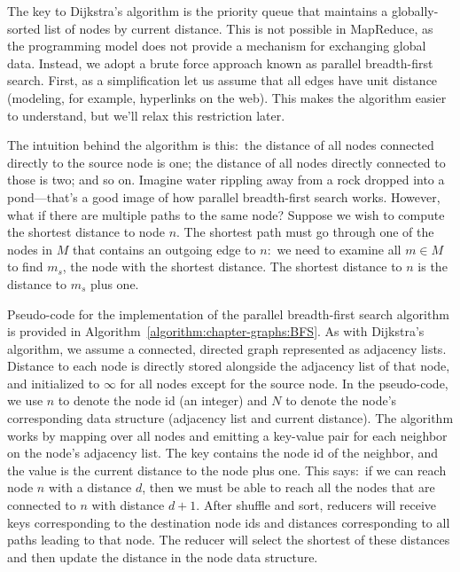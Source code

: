 The key to Dijkstra's algorithm is the priority queue that maintains a
globally-sorted list of nodes by current distance.  This is not
possible in MapReduce, as the programming model does not provide a
mechanism for exchanging global data.  Instead, we adopt a brute force
approach known as parallel breadth-first search.  First, as a
simplification let us assume that all edges have unit distance
(modeling, for example, hyperlinks on the web).  This makes the
algorithm easier to understand, but we'll relax this restriction
later.

The intuition behind the algorithm is this:\ the distance of all nodes
connected directly to the source node is one; the distance of all
nodes directly connected to those is two; and so on.  Imagine water
rippling away from a rock dropped into a pond---that's a good image of
how parallel breadth-first search works.  However, what if there are
multiple paths to the same node?  Suppose we wish to compute the
shortest distance to node $n$.  The shortest path must go through one
of the nodes in $M$ that contains an outgoing edge to $n$:\ we need to
examine all $m \in M$ to find $m_s$, the node with the shortest distance.
The shortest distance to $n$ is the distance to $m_s$ plus one.

Pseudo-code for the implementation of the parallel breadth-first
search algorithm is provided in
Algorithm~\ref{algorithm:chapter-graphs:BFS}.  As with Dijkstra's algorithm,
we assume a connected, directed graph represented as adjacency lists.
Distance to each node is directly stored alongside the adjacency list
of that node, and initialized to $\infty$ for all nodes except for the
source node.  In the pseudo-code, we use $n$ to denote the node id (an
integer) and $N$ to denote the node's corresponding data structure
(adjacency list and current distance).  The algorithm works by mapping
over all nodes and emitting a key-value pair for each neighbor on the
node's adjacency list.  The key contains the node id of the neighbor,
and the value is the current distance to the node plus one.  This
says:\ if we can reach node $n$ with a distance $d$, then we must be
able to reach all the nodes that are connected to $n$ with distance
$d+1$.  After shuffle and sort, reducers will receive keys
corresponding to the destination node ids and distances corresponding
to all paths leading to that node.  The reducer will select the
shortest of these distances and then update the distance in the node
data structure.

